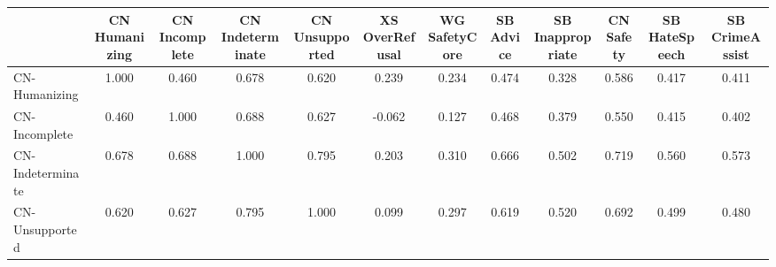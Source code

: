 
\begin{tabular}{lccccccccccc}
\toprule
&\makecell{CN\\Humanizing} & \makecell{CN\\Incomplete} & \makecell{CN\\Indeterminate} & \makecell{CN\\Unsupported} & \makecell{XS\\OverRefusal} & \makecell{WG\\SafetyCore} & \makecell{SB\\Advice} & \makecell{SB\\Inappropriate} & \makecell{CN\\Safety} & \makecell{SB\\HateSpeech} & \makecell{SB\\CrimeAssist} \\
\midrule
CN-Humanizing & \cellcolor[HTML]{57bb8a}1.000 & \cellcolor[HTML]{fff4f3}0.460 & \cellcolor[HTML]{c3e6d5}0.678 & \cellcolor[HTML]{d6eee2}0.620 & \cellcolor[HTML]{ffbab5}0.239 & \cellcolor[HTML]{ffb9b4}0.234 & \cellcolor[HTML]{fff8f7}0.474 & \cellcolor[HTML]{ffd1ce}0.328 & \cellcolor[HTML]{e2f3ea}0.586 & \cellcolor[HTML]{ffe9e7}0.417 & \cellcolor[HTML]{ffe7e6}0.411 \\
CN-Incomplete & \cellcolor[HTML]{fff4f3}0.460 & \cellcolor[HTML]{57bb8a}1.000 & \cellcolor[HTML]{bfe5d3}0.688 & \cellcolor[HTML]{d4ede1}0.627 & \cellcolor[HTML]{ff7c73}-0.062 & \cellcolor[HTML]{ff9d96}0.127 & \cellcolor[HTML]{fff6f6}0.468 & \cellcolor[HTML]{ffdfdd}0.379 & \cellcolor[HTML]{eef8f3}0.550 & \cellcolor[HTML]{ffe8e7}0.415 & \cellcolor[HTML]{ffe5e3}0.402 \\
CN-Indeterminate & \cellcolor[HTML]{c3e6d5}0.678 & \cellcolor[HTML]{bfe5d3}0.688 & \cellcolor[HTML]{57bb8a}1.000 & \cellcolor[HTML]{9bd6b9}0.795 & \cellcolor[HTML]{ffb1ab}0.203 & \cellcolor[HTML]{ffcdc9}0.310 & \cellcolor[HTML]{c7e8d8}0.666 & \cellcolor[HTML]{fefefe}0.502 & \cellcolor[HTML]{b5e1cb}0.719 & \cellcolor[HTML]{eaf6f0}0.560 & \cellcolor[HTML]{e6f5ed}0.573 \\
CN-Unsupported & \cellcolor[HTML]{d6eee2}0.620 & \cellcolor[HTML]{d4ede1}0.627 & \cellcolor[HTML]{9bd6b9}0.795 & \cellcolor[HTML]{57bb8a}1.000 & \cellcolor[HTML]{ff958e}0.099 & \cellcolor[HTML]{ffc9c6}0.297 & \cellcolor[HTML]{d7eee3}0.619 & \cellcolor[HTML]{f8fcfa}0.520 & \cellcolor[HTML]{bee4d2}0.692 & \cellcolor[HTML]{fffefe}0.499 & \cellcolor[HTML]{fff9f9}0.480 \\

\end{tabular}
